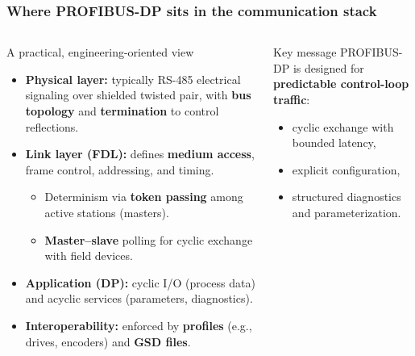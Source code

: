 \begin{frame}
	\frametitle{Where PROFIBUS-DP sits in the communication stack}
	\begin{columns}[T,onlytextwidth]
			\justifying
			\begin{block}{A practical, engineering-oriented view}
				\begin{itemize}
					\item \textbf{Physical layer:} typically RS-485 electrical signaling over shielded twisted pair, with \textbf{bus topology} and \textbf{termination} to control reflections.
					\item \textbf{Link layer (FDL):} defines \textbf{medium access}, frame control, addressing, and timing.
					\begin{itemize}
						\item Determinism via \textbf{token passing} among active stations (masters).
						\item \textbf{Master--slave} polling for cyclic exchange with field devices.
					\end{itemize}
					\item \textbf{Application (DP):} cyclic I/O (process data) and acyclic services (parameters, diagnostics).
					\item \textbf{Interoperability:} enforced by \textbf{profiles} (e.g., drives, encoders) and \textbf{GSD files}.
				\end{itemize}
			\end{block}
			\begin{block}{Key message}
				PROFIBUS-DP is designed for \textbf{predictable control-loop traffic}:
				\begin{itemize}
					\item cyclic exchange with bounded latency,
					\item explicit configuration,
					\item structured diagnostics and parameterization.
				\end{itemize}
			\end{block}
	\end{columns}
\end{frame}

